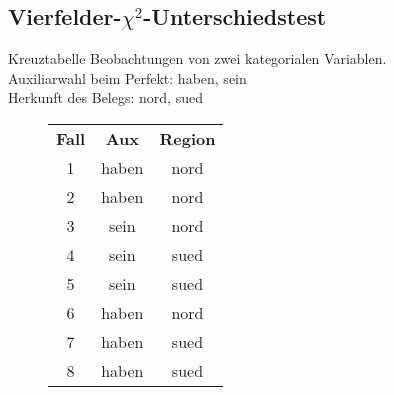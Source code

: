 \subsection[$\chi^2$ (Unterschied)]{Vierfelder-$\chi^2$-Unterschiedstest}

\begin{frame}{Kreuztabelle}
  Beobachtungen von zwei \alert{kategorialen Variablen}.\\
  Auxiliarwahl beim Perfekt: haben, sein\\
  Herkunft des Belegs: nord, sued\\

\begin{figure}[h]
  \centering
  \begin{tabular}{ccc}
    \textbf{Fall} & \textbf{Aux} & \textbf{Region} \\
          1       & haben        & nord   \\
          2       & haben        & nord   \\
          3       & sein         & nord  \\
          4       & sein         & sued  \\
          5       & sein         & sued   \\
          6       & haben        & nord   \\
          7       & haben        & sued   \\
          8       & haben        & sued  \\             
  \end{tabular}
\end{figure}
\end{frame}


